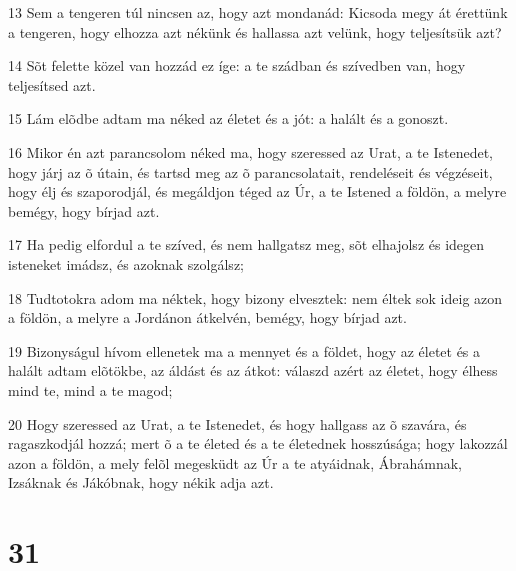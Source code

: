 \par 13 Sem a tengeren túl nincsen az, hogy azt mondanád: Kicsoda megy át érettünk a tengeren, hogy elhozza azt nékünk és hallassa azt velünk, hogy teljesítsük azt?
\par 14 Sõt felette közel van hozzád ez íge: a te szádban és szívedben van, hogy teljesítsed azt.
\par 15 Lám elõdbe adtam ma néked az életet és a jót: a halált és a gonoszt.
\par 16 Mikor én azt parancsolom néked ma, hogy szeressed az Urat, a te Istenedet, hogy járj az õ útain, és tartsd meg az õ parancsolatait, rendeléseit és végzéseit, hogy élj és szaporodjál, és megáldjon téged az Úr, a te Istened a földön, a melyre bemégy, hogy bírjad azt.
\par 17 Ha pedig elfordul a te szíved, és nem hallgatsz meg, sõt elhajolsz és idegen isteneket imádsz, és azoknak szolgálsz;
\par 18 Tudtotokra adom ma néktek, hogy bizony elvesztek: nem éltek sok ideig azon a földön, a melyre a Jordánon átkelvén, bemégy, hogy bírjad azt.
\par 19 Bizonyságul hívom ellenetek ma a mennyet és a földet, hogy az életet és  a halált adtam elõtökbe, az áldást és az átkot: válaszd azért az életet, hogy élhess mind te, mind a te magod;
\par 20 Hogy szeressed az Urat, a te Istenedet, és hogy hallgass az õ szavára, és ragaszkodjál hozzá; mert õ a te életed és a te életednek hosszúsága; hogy lakozzál azon a földön, a mely felõl megesküdt az Úr a te atyáidnak, Ábrahámnak, Izsáknak és Jákóbnak, hogy nékik adja azt.

\chapter{31}

